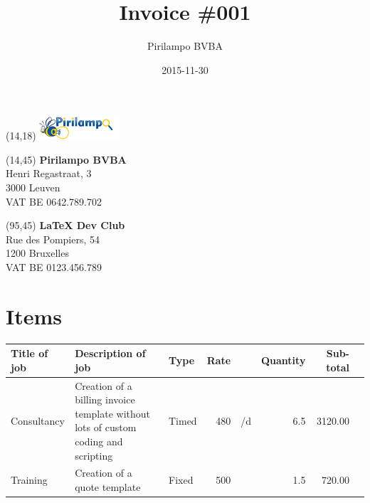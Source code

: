\documentclass[a4paper,table]{article}
\author{Pirilampo BVBA}
\date{2015-11-30}
\title{Invoice \#001}
\begin{document}
\maketitle
{}

\begin{textblock}{40}(14,18) %
\noindent %
\includegraphics[width=30mm]{logo.png}
\end{textblock}

\begin{textblock}{65}(14,45) %
\vspace{8mm}
\noindent %
\textbf{Pirilampo BVBA} \\
Henri Regastraat, 3 \\
3000 Leuven \\
VAT BE 0642.789.702
\vspace{8mm}
\end{textblock}

\begin{textblock}{90}(95,45) %
\vspace{8mm}
\noindent %
\textbf{\LaTeX{} Dev Club} \\
Rue des Pompiers, 54 \\
1200 Bruxelles \\
VAT BE 0123.456.789
\vspace{8mm}
\end{textblock}

\vspace{65mm}

\section*{Items}
\label{sec:orgheadline1}

\extrarowsep=1mm

\begin{center}
\label{tab:orgtable1}

\begin{tabu}{lXlrlrrl}
Title of job & Description of job & Type & Rate &  & Quantity & Sub-total & \\
\hline
Consultancy & Creation of a billing invoice template without lots of custom coding and scripting & Timed & 480 & \texteuro{}/d & 6.5 & 3120.00 & \texteuro{}\\
\hline
Training & Creation of a quote template & Fixed & 500 & \texteuro{} & 1.5 & 720.00 & \texteuro{}\\
\end{tabu}
\end{center}
\end{document}
